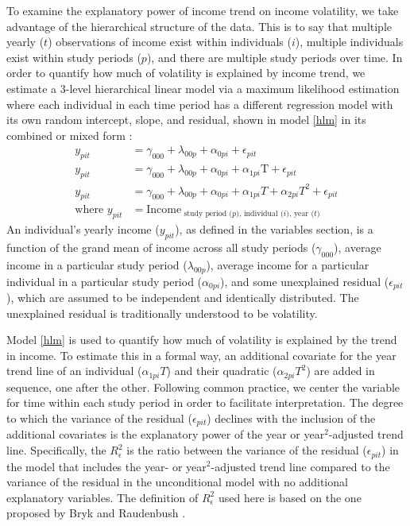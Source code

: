 \documentclass[12pt]{article}
\begin{document}
To examine the explanatory power of income trend on income volatility, we take advantage of the hierarchical structure of the data. This is to say that multiple yearly ($t$) observations of income exist within individuals ($i$), multiple individuals exist within study periods ($p$), and there are multiple study periods over time. In order to quantify how much of volatility is explained by income trend, we estimate a 3-level hierarchical linear model via a maximum likelihood estimation where each individual in each time period has a different regression model with its own random intercept, slope, and residual, shown in model \ref{hlm} in its combined or mixed form \citep{woltman_etal_2012}:
\begin{equation}
\begin{aligned}
y_{pit} &= \gamma_{000} + \lambda_{00p} + \alpha_{0pi} + \epsilon_{pit} \\
y_{pit} &= \gamma_{000} + \lambda_{00p} + \alpha_{0pi} + \alpha_{1pi}\text{T} + \epsilon_{pit} \\ 
y_{pit} &= \gamma_{000} + \lambda_{00p} + \alpha_{0pi} + \alpha_{1pi}T + \alpha_{2pi}T^2 + \epsilon_{pit} \\
\text{where }y_{pit} &= \text{Income}_{\text{ study period ($p$), individual ($i$), year ($t$)}}
\label{hlm}
\end{aligned}
\end{equation}
An individual's yearly income ($y_{pit}$), as defined in the variables section, is a function of the grand mean of income across all study periods ($\gamma_{000}$), average income in a particular study period ($\lambda_{00p}$), average income for a particular individual in a particular study period ($\alpha_{0pi}$), and some unexplained residual ($\epsilon_{pit}$), which are assumed to be independent and identically distributed. The unexplained residual is traditionally understood to be volatility.

Model \ref{hlm} is used to quantify how much of volatility is explained by the trend in income. To estimate this in a formal way, an additional covariate for the year trend line of an individual ($\alpha_{1pi}T$) and their quadratic ($\alpha_{2pi}T^2$) are added in sequence, one after the other. Following common practice, we center the variable for time within each study period in order to facilitate interpretation. The degree to which the variance of the residual ($\epsilon_{pit}$) declines with the inclusion of the additional covariates is the explanatory power of the year or year$^2$-adjusted trend line. Specifically, the $R_\epsilon^2$ is the ratio between the variance of the residual ($\epsilon_{pit}$) in the model that includes the year- or year$^2$-adjusted trend line compared to the variance of the residual in the unconditional model with no additional explanatory variables. The definition of $R_\epsilon^2$ used here is based on the one proposed by Bryk and Raudenbush \citep[pg. 72]{bryk_raudenbush_1992}.
\end{document}
